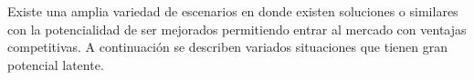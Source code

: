 
Existe una amplia variedad de escenarios en donde existen soluciones \ecommerce o similares con la potencialidad de ser mejorados permitiendo entrar al mercado con ventajas competitivas. A continuación se describen variados situaciones que tienen gran potencial latente.


